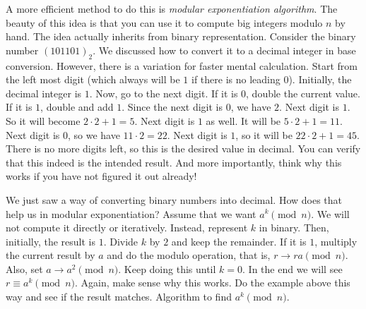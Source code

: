 A more efficient method to do this is \textit{modular exponentiation algorithm}. The beauty of this idea is that you can use it to compute big integers modulo $n$ by hand. The idea actually inherits from binary representation. Consider the binary number $(101101)_2$. We discussed how to convert it to a decimal integer in base conversion. However, there is a variation for faster mental calculation. Start from the left most digit (which always will be $1$ if there is no leading $0$). Initially, the decimal integer is $1$. Now, go to the next digit. If it is $0$, double the current value. If it is $1$, double and add $1$. Since the next digit is $0$, we have $2$. Next digit is $1$. So it will become $2\cdot2+1=5$. Next digit is $1$ as well. It will be $5\cdot2+1=11$. Next digit is $0$, so we have $11\cdot2=22$. Next digit is $1$, so it will be $22\cdot2+1=45$. There is no more digits left, so this is the desired value in decimal. You can verify that this indeed is the intended result. And more importantly, think why this works if you have not figured it out already!

We just saw a way of converting binary numbers into decimal. How does that help us in modular exponentiation? Assume that we want $a^k\pmod n$. We will not compute it directly or iteratively. Instead, represent $k$ in binary. Then, initially, the result is $1$. Divide $k$ by $2$ and keep the remainder. If it is $1$, multiply the current result by $a$ and do the modulo operation, that is, $r\to ra\pmod n$. Also, set $a\to a^2\pmod n$. Keep doing this until $k=0$. In the end we will see $r\equiv a^k\pmod n$. Again, make sense why this works. Do the example above this way and see if the result matches. Algorithm to find $a^k\pmod n$.
